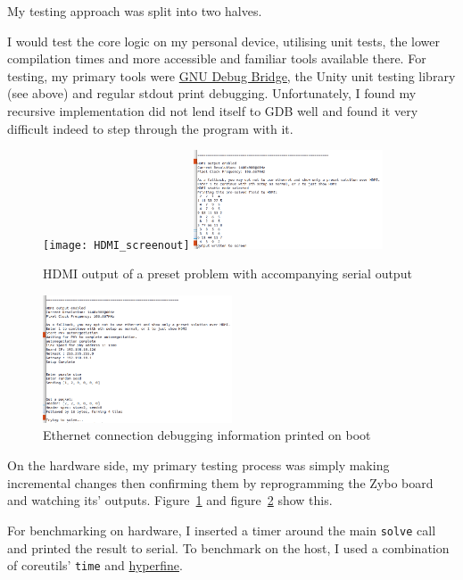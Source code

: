 \documentclass[11pt]{article}
\begin{document}
My testing approach was split into two halves.

I would test the core logic on my personal device, utilising unit tests, the lower compilation times and more accessible and familiar tools available there.
For testing, my primary tools were \href{https://www.gnu.org/software/gdb/}{GNU Debug Bridge}, the Unity unit testing library (see above) and regular stdout print debugging.
Unfortunately, I found my recursive implementation did not lend itself to GDB well and found it very difficult indeed to step through the program with it.

\begin{figure}[h]
  \centering
  \texttt{[image: HDMI\_screenout]}
  \includegraphics[width=0.5\textwidth]{HDMI_serialout}
  \caption{HDMI output of a preset problem with accompanying serial output}
  \label{fig:hdmi_debug}
\end{figure}

\begin{figure}[h]
  \centering
  \includegraphics[width=0.5\textwidth]{eth_serialout}
  \caption{Ethernet connection debugging information printed on boot}
  \label{fig:eth_debug}
\end{figure}

On the hardware side, my primary testing process was simply making incremental changes then confirming them by reprogramming the Zybo board and watching its' outputs.
Figure~\ref{fig:hdmi_debug} and figure~\ref{fig:eth_debug} show this.

For benchmarking on hardware, I inserted a timer around the main \verb|solve| call and printed the result to serial.
To benchmark on the host, I used a combination of coreutils' \verb|time| and \href{https://github.com/sharkdp/hyperfine}{hyperfine}.
\end{document}
